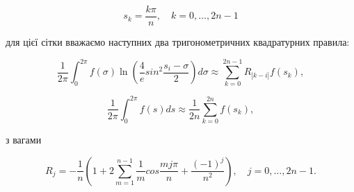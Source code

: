 \documentclass{article}
\begin{document}
\begin{equation}
    s_k = \frac{k \pi}{n}, \quad k=0, \dots, 2n-1
\end{equation}

для цієї сітки вважаємо наступних два тригонометричних квадратурних правила:

\begin{equation}
\frac{1}{2\pi} \int_{0}^{2\pi} f(\sigma) \ln \left( \frac{4}{e} sin^2 \frac{s_i- \sigma}{2}\right) d\sigma \approx \sum_{k=0}^{2n-1} R_{| k- i |} f(s_k),
\end{equation}

\begin{equation}
    \frac{1}{2\pi} \int_{0}^{2\pi} f(s)ds \approx \frac{1}{2n} \sum_{k=0}^{2n} f(s_k),
\end{equation}

з вагами

\begin{equation*}
    R_j = - \frac{1}{n} \left( 1 + 2 \sum_{m=1}^{n-1}  \frac{1}{m} cos\frac{mj\pi}{n} + \frac{(-1)^j}{n^2}  \right), \quad j=0, \dots, 2n-1.
\end{equation*}
\end{document}

